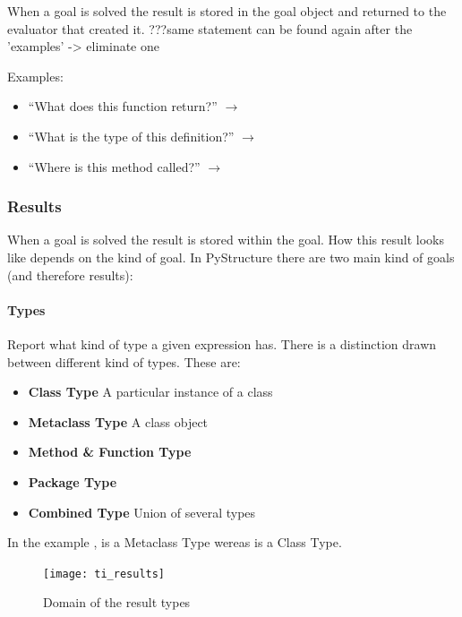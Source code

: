 \documentclass[12pt,halfparskip,DIV11,BCOR10mm]{scrreprt}
\begin{document}
When a goal is solved the result is stored in the goal object and returned to the evaluator that created it. ???same statement can be found again after the 'examples' -> eliminate one

Examples:

\begin{itemize}
    \item ``What does this function return?''  $\rightarrow$  
    \item ``What is the type of this definition?'' $\rightarrow$ 
    \item ``Where is this method called?'' $\rightarrow$ 
\end{itemize}

\subsubsection{Results}

When a goal is solved the result is stored within the goal. How this result looks like depends on the kind of goal. In PyStructure there are two main kind of goals (and therefore results):

\paragraph{Types}

Report what kind of type a given expression has. There is a distinction drawn between different kind of types. These are:

\begin{itemize}
    \item \textbf{Class Type} A particular instance of a class
    \item \textbf{Metaclass Type} A class object
    \item \textbf{Method \& Function Type}
    \item \textbf{Package Type}
    \item \textbf{Combined Type} Union of several types
\end{itemize}

In the example ,  is a Metaclass Type wereas  is a Class Type.


\begin{figure}[H]
    \centering
    \texttt{[image: ti\_results]}
    \caption{Domain of the result types}
    \label{fig:ti_results}
\end{figure}
\end{document}
